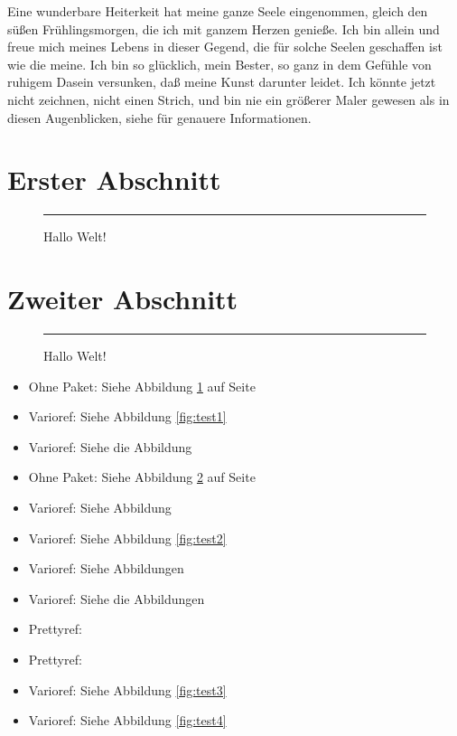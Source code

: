 \documentclass[ngerman]{scrartcl}
\begin{document}
Eine wunderbare Heiterkeit hat meine ganze Seele eingenommen, gleich den süßen Frühlingsmorgen, die ich mit ganzem Herzen genieße. Ich bin allein und freue mich meines Lebens in dieser Gegend, die für solche Seelen geschaffen  ist wie die meine. Ich bin so glücklich, mein Bester, so ganz in dem Gefühle von ruhigem Dasein versunken, daß meine Kunst darunter leidet. Ich könnte jetzt nicht zeichnen, nicht einen Strich, und bin nie ein größerer Maler gewesen als in diesen Augenblicken, siehe für genauere Informationen. 

 
\section{Erster Abschnitt}\label{sec:erst}
 
\blindtext[3]
 
\begin{figure}[h]%
\rule{\columnwidth}{5cm}
\caption{Hallo Welt!}%
\label{fig:test1}%
\end{figure}
 
\blindtext[1]
 
\section{Zweiter Abschnitt}
 
\blindtext[5]
 
\begin{figure}%
\rule{\columnwidth}{5cm}
\caption{Hallo Welt!}%
\label{fig:test2}%
\end{figure}
 
\blindtext[4]
 
\begin{itemize}
	\item Ohne Paket: Siehe Abbildung \textcolor{red}{\ref{fig:test1}} auf Seite \textcolor{red}{\pageref{fig:test1}}
	\item Varioref: Siehe Abbildung \textcolor{red}{\vref{fig:test1}}
	\item Varioref: Siehe die Abbildung \textcolor{red}{}
	\item Ohne Paket: Siehe Abbildung \textcolor{red}{\ref{fig:test2}} auf Seite \textcolor{red}{\pageref{fig:test2}}
	\item Varioref: Siehe Abbildung \textcolor{red}{}
	\item Varioref: Siehe Abbildung \textcolor{red}{\vref{fig:test2}}
	\item Varioref: Siehe Abbildungen \textcolor{red}{}
	\item Varioref: Siehe die Abbildungen \textcolor{red}{}
	\item Prettyref: \textcolor{red}{}
	\item Prettyref: \textcolor{red}{}
	\item Varioref: Siehe Abbildung \textcolor{red}{\vref{fig:test3}}
	\item Varioref: Siehe Abbildung \textcolor{red}{\vref{fig:test4}}
\end{itemize}
 
\end{document}
